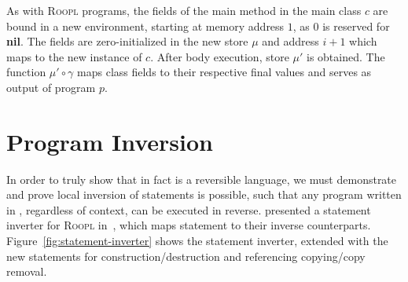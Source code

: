 As with \textsc{Roopl} programs, the fields of the main method in the main class $c$ are bound in a new environment, starting at memory address $1$, as $0$ is reserved for \textbf{nil}. The fields are zero-initialized in the new store $\mu$ and address $i + 1$ which maps to the new instance of $c$. After body execution, store $\mu'$ is obtained. The function $\mu' \circ \gamma$ maps class fields to their respective final values and serves as output of program $p$.


\section{Program Inversion}
\label{sec:program-inversion}
In order to truly show that \rooplpp in fact is a reversible language, we must demonstrate and prove local inversion of statements is possible, such that any program written in \rooplpp, regardless of context, can be executed in reverse. \citeauthor{th:roopl} presented a statement inverter for \textsc{Roopl} in~\cite{th:roopl}, which maps statement to their inverse counterparts. Figure~\ref{fig:statement-inverter} shows the statement inverter, extended with the new \rooplpp statements for construction/destruction and referencing copying/copy removal.

